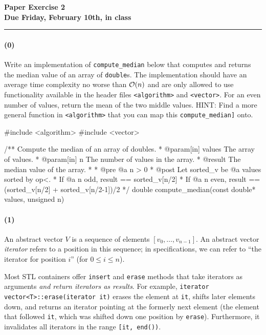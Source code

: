 \documentclass[12pt,letterpaper,twoside]{article}
\begin{document}
{\centering \textbf{Paper Exercise 2\\ Due Friday, February 10th, in class \\}}
\vspace*{-8pt}\noindent\rule{\linewidth}{1pt}

\paragraph{(0)} Write an implementation of {\tt compute\_median} below that computes and returns the median value of an array of {\tt double}s. The implementation should have an average time complexity no worse than $\mathcal{O}(n)$ and are only allowed to use functionality available in the header files {\tt <algorithm>} and {\tt <vector>}. For an even number of values, return the mean of the two middle values. HINT: Find a more general function in {\tt <algorithm>} that you can map this {\tt compute\_median]} onto.
\begin{cpp}
#include <algorithm>
#include <vector>

/** Compute the median of an array of doubles.
 * @param[in] values  The array of values.
 * @param[in]      n  The number of values in the array.
 * @result The median value of the array.
 *
 * @pre @a n > 0
 * @post Let sorted_v be @a values sorted by op<.
 *         If @a n odd,  result ==  sorted_v[n/2]
 *         If @a n even, result == (sorted_v[n/2] + sorted_v[n/2-1])/2
 */
double compute_median(const double* values, unsigned n)
\end{cpp}

\paragraph{(1)} An abstract vector $V$ is a sequence of elements $[v_0,
\dots, v_{n-1}]$. An abstract vector \emph{iterator} refers to a position
in this sequence; in specifications, we can refer to ``the iterator for position
$i$'' (for $0\leq i\leq n$).

Most STL containers offer \texttt{insert} and \texttt{erase} methods that take iterators as arguments \emph{and return iterators as results}. For example, \texttt{iterator vector<T>::erase(iterator it)} erases the element at \texttt{it}, shifts later elements down, and returns an iterator pointing at the formerly next element (the element that followed \texttt{it}, which was shifted down one position by \texttt{erase}). Furthermore, it invalidates all iterators in the range \texttt{[it, end())}.
\end{document}
